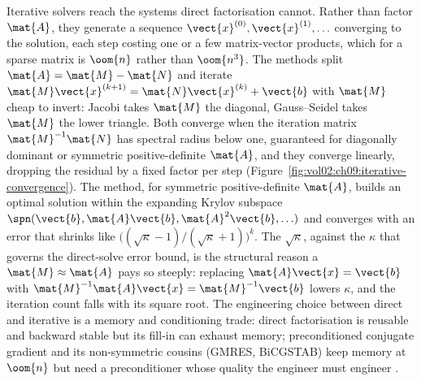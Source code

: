\begin{mastery}
Iterative solvers reach the systems direct factorisation cannot.
Rather than factor $\mat{A}$, they generate a sequence
$\vect{x}^{(0)}, \vect{x}^{(1)}, \ldots$ converging to the solution,
each step costing one or a few matrix-vector products, which for a
sparse matrix is $\oom{n}$ rather than $\oom{n^{3}}$. The
 methods split $\mat{A} = \mat{M} - \mat{N}$ and
iterate $\mat{M}\vect{x}^{(k+1)} = \mat{N}\vect{x}^{(k)} + \vect{b}$
with $\mat{M}$ cheap to invert: Jacobi takes $\mat{M}$ the diagonal,
Gauss--Seidel takes $\mat{M}$ the lower triangle. Both converge when
the iteration matrix $\mat{M}^{-1}\mat{N}$ has spectral radius below
one, guaranteed for diagonally dominant or symmetric positive-definite
$\mat{A}$, and they converge linearly, dropping the residual by a
fixed factor per step (Figure~\ref{fig:vol02:ch09:iterative-convergence}).
The  method, for symmetric positive-definite
$\mat{A}$, builds an optimal solution within the expanding Krylov
subspace $\spn(\vect{b}, \mat{A}\vect{b}, \mat{A}^{2}\vect{b},
\ldots)$ and converges with an error that shrinks like
$\bigl((\sqrt{\kappa} - 1)/(\sqrt{\kappa} + 1)\bigr)^{k}$. The
$\sqrt{\kappa}$, against the $\kappa$ that governs the direct-solve
error bound, is the structural reason a 
$\mat{M} \approx \mat{A}$ pays so steeply: replacing $\mat{A}\vect{x}
= \vect{b}$ with $\mat{M}^{-1}\mat{A}\vect{x} = \mat{M}^{-1}\vect{b}$
lowers $\kappa$, and the iteration count falls with its square root.
The engineering choice between direct and iterative is a memory and
conditioning trade: direct factorisation is reusable and
backward stable but its fill-in can exhaust memory; preconditioned
conjugate gradient and
its non-symmetric cousins (GMRES, BiCGSTAB) keep memory at $\oom{n}$
but need a preconditioner whose quality the engineer must engineer
\cite[ch.~32]{text:trefethen-bau1997}.
\end{mastery}



